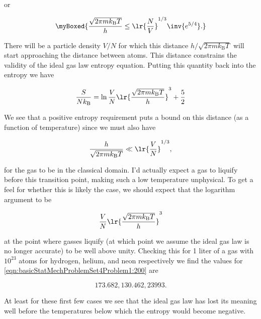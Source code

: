 {or

\begin{equation}\label{eqn:basicStatMechProblemSet4Problem1:140}
\myBoxed{
\frac{\sqrt{2 \pi m k_{\mathrm{B}} T}}{h} \le \lr{\frac{N}{V}}^{1/3} \inv{e^{5/4}}.
}
\end{equation}

There will be a particle density $V/N$ for which this distance $h/\sqrt{2 \pi m k_{\mathrm{B}} T}$ will start approaching the distance between atoms.  This distance constrains the validity of the ideal gas law entropy equation.  Putting this quantity back into the entropy  we have

\begin{equation}\label{eqn:basicStatMechProblemSet4Problem1:160}
\frac{S}{N k_{\mathrm{B}}} = \ln \frac{V}{N} \lr{\frac{\sqrt{2 \pi m k_{\mathrm{B}} T}}{h}}^3 + \frac{5}{2}
\end{equation}

We see that a positive entropy requirement puts a bound on this distance (as a function of temperature) since we must also have

\begin{equation}\label{eqn:basicStatMechProblemSet4Problem1:180}
\frac{h}{\sqrt{2 \pi m k_{\mathrm{B}} T}} \ll \lr{\frac{V}{N}}^{1/3},
\end{equation}

for the gas to be in the classical domain.  I'd actually expect a gas to liquify before this transition point, making such a low temperature unphysical.  To get a feel for whether this is likely the case, we should expect that the logarithm argument to be

\begin{equation}\label{eqn:basicStatMechProblemSet4Problem1:200}
\frac{V}{N} \lr{\frac{\sqrt{2 \pi m k_{\mathrm{B}} T}}{h}}^3
\end{equation}

at the point where gasses liquify (at which point we assume the ideal gas law is no longer accurate) to be well above unity.  Checking this for 1 liter of a gas with $10^23$ atoms for hydrogen, helium, and neon respectively we find the values for \ref{eqn:basicStatMechProblemSet4Problem1:200} are

\begin{equation}\label{eqn:basicStatMechProblemSet4Problem1:220}
173.682, 130.462, 23993.
\end{equation}

At least for these first few cases we see that the ideal gas law has lost its meaning well before the temperatures below which the entropy would become negative.
}
